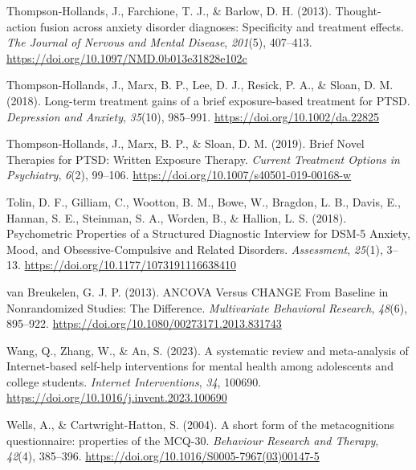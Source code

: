 \documentclass[
  man,floatsintext]{apa7}
\newlength{\cslhangindent}
\newlength{\cslentryspacingunit} %
\newenvironment{CSLReferences}[2] %
 {%
  \setlength{\parindent}{0pt}
  \ifodd #1
  \let\oldpar\par
  \def\par{\hangindent=\cslhangindent\oldpar}
  \fi
  \setlength{\parskip}{#2\cslentryspacingunit}
 }%
 {}
\begin{document}
\begin{CSLReferences}{1}{0}
\leavevmode{}%
Thompson-Hollands, J., Farchione, T. J., \& Barlow, D. H. (2013). Thought-action fusion across anxiety disorder diagnoses: Specificity and treatment effects. \emph{The Journal of Nervous and Mental Disease}, \emph{201}(5), 407--413. \url{https://doi.org/10.1097/NMD.0b013e31828e102c}

\leavevmode{}%
Thompson-Hollands, J., Marx, B. P., Lee, D. J., Resick, P. A., \& Sloan, D. M. (2018). Long-term treatment gains of a brief exposure-based treatment for PTSD. \emph{Depression and Anxiety}, \emph{35}(10), 985--991. \url{https://doi.org/10.1002/da.22825}

\leavevmode{}%
Thompson-Hollands, J., Marx, B. P., \& Sloan, D. M. (2019). Brief Novel Therapies for PTSD: Written Exposure Therapy. \emph{Current Treatment Options in Psychiatry}, \emph{6}(2), 99--106. \url{https://doi.org/10.1007/s40501-019-00168-w}

\leavevmode{}%
Tolin, D. F., Gilliam, C., Wootton, B. M., Bowe, W., Bragdon, L. B., Davis, E., Hannan, S. E., Steinman, S. A., Worden, B., \& Hallion, L. S. (2018). Psychometric Properties of a Structured Diagnostic Interview for DSM-5 Anxiety, Mood, and Obsessive-Compulsive and Related Disorders. \emph{Assessment}, \emph{25}(1), 3--13. \url{https://doi.org/10.1177/1073191116638410}

\leavevmode{}%
van Breukelen, G. J. P. (2013). ANCOVA Versus CHANGE From Baseline in Nonrandomized Studies: The Difference. \emph{Multivariate Behavioral Research}, \emph{48}(6), 895--922. \url{https://doi.org/10.1080/00273171.2013.831743}

\leavevmode{}%
Wang, Q., Zhang, W., \& An, S. (2023). A systematic review and meta-analysis of Internet-based self-help interventions for mental health among adolescents and college students. \emph{Internet Interventions}, \emph{34}, 100690. \url{https://doi.org/10.1016/j.invent.2023.100690}

\leavevmode{}%
Wells, A., \& Cartwright-Hatton, S. (2004). A short form of the metacognitions questionnaire: properties of the MCQ-30. \emph{Behaviour Research and Therapy}, \emph{42}(4), 385--396. \url{https://doi.org/10.1016/S0005-7967(03)00147-5}


\end{CSLReferences}
\end{document}

